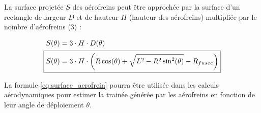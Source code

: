 La surface projetée $S$ des aérofreins peut être approchée par la surface d'un rectangle de largeur $D$ et de hauteur $H$ (hauteur
des aérofreins) multipliée par le nombre d'aérofreins (3) :

\begin{align}
    S(\theta) &= 3 \cdot H \cdot D(\theta) \\
    \Aboxed{S(\theta) &= 3 \cdot H \cdot \left( R \cos(\theta) + \sqrt{L^2 - R^2 \sin^2(\theta)} - R_{fusee} \right)} \label{eq:surface_aerofrein}
\end{align}

La formule \ref{eq:surface_aerofrein} pourra être utilisée dans les calculs aérodynamiques pour estimer la trainée générée par les
aérofreins en fonction de leur angle de déploiement $\theta$.

\newpage